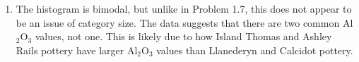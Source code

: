 \documentclass[12pt]{article}
\begin{document}
\begin{enumerate}[label=(\alph*).]
\begin{enumerate}[label=(\alph*).]
        \item The histogram is bimodal, but unlike in Problem 1.7, this does not appear to be an issue of category size. The data suggests that there are two common Al$_2$O$_3$ values, not one. This is likely due to how Island Thomas and Ashley Rails pottery have larger Al$_2$O$_3$ values than Llanederyn and Calcidot pottery.
        
    \end{enumerate}
        
        
    \end{enumerate}
\end{document}
